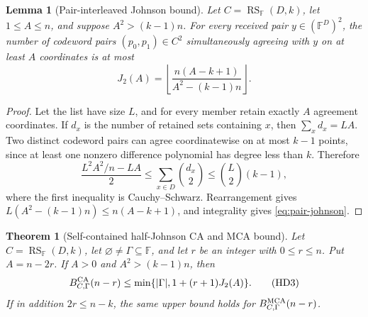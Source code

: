 \documentclass[11pt,a4paper]{amsart}
\numberwithin{equation}{section}
\newtheorem{theorem}{Theorem}[section]
\newtheorem{lemma}[lemma]{Lemma}
\theoremstyle{remark}
\DeclareMathOperator{\RS}{RS}
\newcommand{\F}{\mathbb F}
\newcommand{\abs}[1]{\lvert #1\rvert}
\newcommand{\floor}[1]{\left\lfloor #1\right\rfloor}
\begin{document}
\begin{lemma}[Pair-interleaved Johnson bound]
\label{lem:pair-interleaved-johnson}
Let \(C=\RS_\F(D,k)\), let \(1\le A\le n\), and suppose
\(A^2>(k-1)n\).  For every received pair \(y\in(\F^D)^2\), the number
of codeword pairs \((p_0,p_1)\in C^2\) simultaneously agreeing with
\(y\) on at least \(A\) coordinates is at most
\[
 J_2(A)=\floor{
   \frac{n(A-k+1)}{A^2-(k-1)n}}.                  \tag{HD2}
 \label{eq:pair-johnson}
\]
\end{lemma}

\begin{proof}
Let the list have size \(L\), and for every member retain exactly \(A\)
agreement coordinates.  If \(d_x\) is the number of retained sets
containing \(x\), then \(\sum_xd_x=LA\).  Two distinct codeword pairs
can agree coordinatewise on at most \(k-1\) points, since at least one
nonzero difference polynomial has degree less than \(k\).  Therefore
\[
 \frac{L^2A^2/n-LA}{2}
 \le\sum_{x\in D}\binom{d_x}{2}
 \le\binom L2(k-1),
\]
where the first inequality is Cauchy--Schwarz.  Rearrangement gives
\(L(A^2-(k-1)n)\le n(A-k+1)\), and integrality gives
\eqref{eq:pair-johnson}.
\end{proof}

\begin{theorem}[Self-contained half-Johnson CA and MCA bound]
\label{thm:self-contained-half-johnson}
Let \(C=\RS_\F(D,k)\), let \(\varnothing\ne\Gamma\subseteq\F\), and
let \(r\) be an integer with \(0\le r\le n\).  Put \(A=n-2r\).  If
\(A>0\) and \(A^2>(k-1)n\), then
\[
 B_{C,\Gamma}^{\rm CA}(n-r)
 \le\min\{\abs\Gamma,1+(r+1)J_2(A)\}.             \tag{HD3}
 \label{eq:half-johnson-ca}
\]
If in addition \(2r\le n-k\), the same upper bound holds for
\(B_{C,\Gamma}^{\rm MCA}(n-r)\).
\end{theorem}
\end{document}
